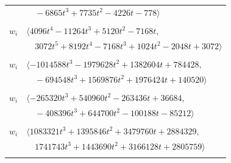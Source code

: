 \documentclass[11pt]{article}
\begin{document}
\begin{longtable}{@{}ll@{}}
 & $\quad -6865t^{3}+7735t^{2}-4226t-778\rangle$\\
\addlinespace[2pt]
\multicolumn{2}{@{}p{0.97\textwidth}@{}}{$i=43$, $D_i=1024$, $\rho_{ij}$: $9{:}1, \allowbreak 10{:}2, \allowbreak 21{:}1, \allowbreak 33{:}2, \allowbreak 46{:}1, \allowbreak 51{:}2, \allowbreak 53{:}2, \allowbreak 62{:}1$}\\
$w_i$ & $\langle 4096t^{4}-11264t^{3}+5120t^{2}-7168t,$\\
 & $\quad 3072t^{5}+8192t^{4}-7168t^{3}+1024t^{2}-2048t+3072\rangle$\\
\addlinespace[2pt]
\multicolumn{2}{@{}p{0.97\textwidth}@{}}{$i=44$, $D_i=32768$, $\rho_{ij}$: $6{:}1, \allowbreak 7{:}1, \allowbreak 12{:}2, \allowbreak 15{:}2, \allowbreak 22{:}1, \allowbreak 26{:}1, \allowbreak 27{:}1, \allowbreak 29{:}1, \allowbreak 31{:}2, \allowbreak 34{:}2, \allowbreak 37{:}1, \allowbreak 41{:}1, \allowbreak 51{:}2, \allowbreak 56{:}2, \allowbreak 65{:}1$}\\
$w_i$ & $\langle -1014588t^{3}-1979628t^{2}+1382604t+784428,$\\
 & $\quad -694548t^{3}+1569876t^{2}+1976424t+140520\rangle$\\
\addlinespace[2pt]
\multicolumn{2}{@{}p{0.97\textwidth}@{}}{$i=45$, $D_i=4096$, $\rho_{ij}$: $2{:}1, \allowbreak 6{:}1, \allowbreak 8{:}1, \allowbreak 14{:}2, \allowbreak 18{:}1, \allowbreak 25{:}2, \allowbreak 28{:}1, \allowbreak 30{:}1, \allowbreak 34{:}1, \allowbreak 37{:}1, \allowbreak 56{:}2, \allowbreak 61{:}2$}\\
$w_i$ & $\langle -265320t^{3}+540960t^{2}-263436t+36684,$\\
 & $\quad -408396t^{3}+644700t^{2}-100188t-85212\rangle$\\
\addlinespace[2pt]
\multicolumn{2}{@{}p{0.97\textwidth}@{}}{$i=46$, $D_i=32768$, $\rho_{ij}$: $1{:}1, \allowbreak 2{:}1, \allowbreak 5{:}2, \allowbreak 6{:}1, \allowbreak 8{:}2, \allowbreak 10{:}2, \allowbreak 20{:}1, \allowbreak 28{:}1, \allowbreak 34{:}2, \allowbreak 43{:}2, \allowbreak 48{:}2, \allowbreak 52{:}2, \allowbreak 54{:}1, \allowbreak 55{:}1$}\\
$w_i$ & $\langle 1083321t^{3}+1395846t^{2}+3479760t+2884329,$\\
 & $\quad 1741743t^{3}+1443690t^{2}+3166128t+2805759\rangle$\\
\addlinespace[2pt]
\multicolumn{2}{@{}p{0.97\textwidth}@{}}{$i=47$, $D_i=1024$, $\rho_{ij}$: $3{:}2, \allowbreak 11{:}1, \allowbreak 18{:}2, \allowbreak 28{:}2, \allowbreak 36{:}2, \allowbreak 40{:}1, \allowbreak 42{:}1, \allowbreak 56{:}1, \allowbreak 64{:}2, \allowbreak 65{:}2$}\\

\end{longtable}
\end{document}
